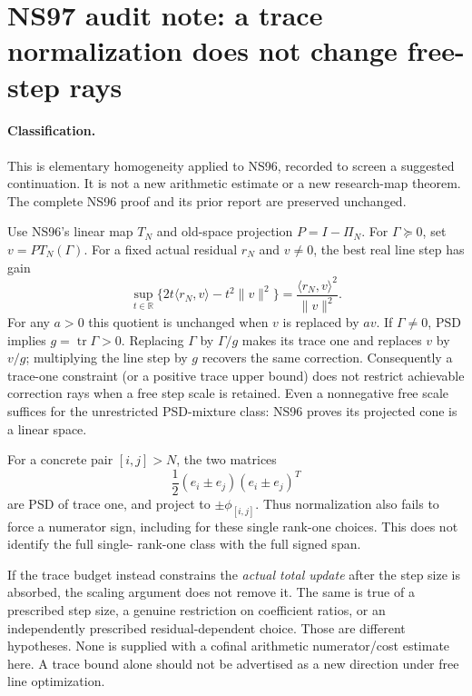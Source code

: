 \section*{NS97 audit note: a trace normalization does not change free-step rays}
\paragraph{Classification.}
This is elementary homogeneity applied to NS96, recorded to screen a
suggested continuation. It is not a new arithmetic estimate or a new
research-map theorem. The complete NS96 proof and its prior report are
preserved unchanged.

Use NS96's linear map $T_N$ and old-space projection $P=I-\Pi_N$.
For $\Gamma\succeq0$, set $v=P T_N(\Gamma)$. For a fixed actual residual
$r_N$ and $v\ne0$, the best real line step has gain
\[
 \sup_{t\in\mathbb R}\{2t\langle r_N,v\rangle-t^2\|v\|^2\}
 =\frac{\langle r_N,v\rangle^2}{\|v\|^2}.
\]
For any $a>0$ this quotient is unchanged when $v$ is replaced by $av$.
If $\Gamma\ne0$, PSD implies $g=\operatorname{tr}\Gamma>0$.
Replacing $\Gamma$ by $\Gamma/g$ makes its trace one and replaces $v$
by $v/g$; multiplying the line step by $g$ recovers the same correction.
Consequently a trace-one constraint (or a positive trace upper bound)
does not restrict achievable correction rays when a free step scale is
retained. Even a nonnegative free scale suffices for the unrestricted
PSD-mixture class: NS96 proves its projected cone is a linear space.

For a concrete pair $[i,j]>N$, the two matrices
\[
 \frac12(e_i\pm e_j)(e_i\pm e_j)^T
\]
are PSD of trace one, and project to $\pm\phi_{[i,j]}$.
Thus normalization also fails to force a numerator sign, including for
these single rank-one choices. This does not identify the full single-
rank-one class with the full signed span.

If the trace budget instead constrains the \emph{actual total update}
after the step size is absorbed, the scaling argument does not remove
it. The same is true of a prescribed step size, a genuine restriction on
coefficient ratios, or an independently prescribed residual-dependent
choice. Those are different hypotheses. None is supplied with a cofinal
arithmetic numerator/cost estimate here. A trace bound alone should not
be advertised as a new direction under free line optimization.
